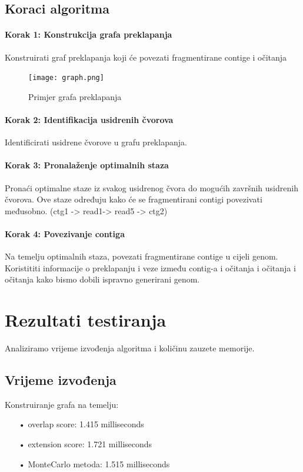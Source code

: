 \documentclass[times, utf8, seminar]{fer}
\begin{document}
\newpage
\section{Koraci algoritma}
\subsubsection{Korak 1: Konstrukcija grafa preklapanja}
Konstruirati graf preklapanja koji će povezati fragmentirane contige i očitanja

\begin{figure}[H]
  \centering
  \texttt{[image: graph.png]}
  \caption{Primjer grafa preklapanja}
  \label{fig:graph}
\end{figure}

\subsubsection{Korak 2: Identifikacija usidrenih čvorova}
Identificirati usidrene čvorove u grafu preklapanja.

\subsubsection{Korak 3: Pronalaženje optimalnih staza}
Pronaći optimalne staze iz svakog usidrenog čvora do mogućih završnih usidrenih čvorova. Ove staze određuju kako će se fragmentirani contigi povezivati međusobno.
\newline
(ctg1 -> read1-> read5 -> ctg2)

\subsubsection{Korak 4: Povezivanje contiga}
Na temelju optimalnih staza, povezati fragmentirane contige u cijeli genom. Koristititi informacije o preklapanju i veze između contig-a i očitanja i očitanja i očitanja kako bismo dobili ispravno generirani genom.

\chapter{Rezultati testiranja}
Analiziramo vrijeme izvođenja algoritma i količinu zauzete memorije.
\section{Vrijeme izvođenja}
Konstruiranje grafa na temelju:
\begin{itemize}
    \item[•]{overlap score: 1.415 milliseconds}
    \item[•]{extension score: 1.721 milliseconds}
    \item[•]{MonteCarlo metoda: 1.515 milliseconds}
\end{itemize}
\end{document}
